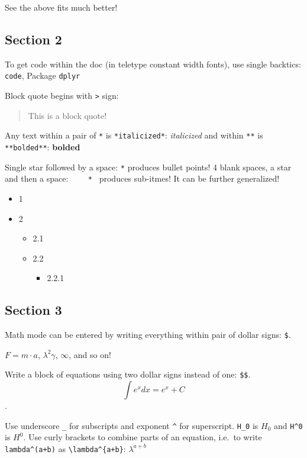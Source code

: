 \documentclass[12pt,]{article}
\providecommand{\tightlist}{%
  \setlength{\itemsep}{0pt}\setlength{\parskip}{0pt}}
\begin{document}
See the above fits much better!

\subsection{Section 2}\label{section-2}

To get code within the doc (in teletype constant width fonts), use
single backtics: \texttt{code}, Package \texttt{dplyr}

Block quote begins with \texttt{\textgreater{}} sign:

\begin{quote}
This is a block quote!
\end{quote}

Any text within a pair of \texttt{*} is \texttt{*italicized*}:
\emph{italicized} and within \texttt{**} is \texttt{**bolded**}:
\textbf{bolded}

Single star followed by a space: \texttt{*} produces bullet points! 4
blank spaces, a star and then a space:
\texttt{\textbar{}\ \ \ \ *\ \textbar{}} produces sub-itmes! It can be
further generalized!

\begin{itemize}
\tightlist
\item
  1
\item
  2

  \begin{itemize}
  \tightlist
  \item
    2.1
  \item
    2.2

    \begin{itemize}
    \tightlist
    \item
      2.2.1
    \end{itemize}
  \end{itemize}
\end{itemize}

\subsection{Section 3}\label{section-3}

Math mode can be entered by writing everything within pair of dollar
signs: \texttt{\$}.

\(F = m \cdot a\), \(\lambda^2 \gamma\), \(\infty\), and so on!

Write a block of equations using two dollar signs instead of one:
\texttt{\$\$}. \[\int e^x dx = e^x + C\].

Use underscore \texttt{\_} for subscripts and exponent \texttt{\^{}} for
superscript. \texttt{H\_0} is \(H_0\) and \texttt{H\^{}0} is \(H^0\).
Use curly brackets to combine parts of an equation, i.e.~to write
\texttt{lambda\^{}(a+b)} as \texttt{\textbackslash{}lambda\^{}\{a+b\}}:
\(\lambda^{a+b}\)
\end{document}
